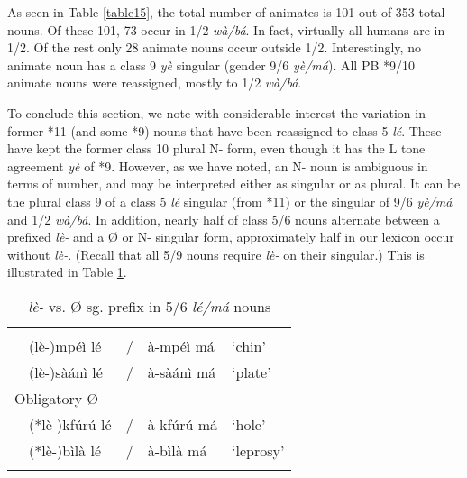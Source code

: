\documentclass[output=paper,,modfonts,nonflat]{langsci/langscibook-Hyman-et-al}
\begin{document}
As seen in Table \ref{table15}, the total number of animates is 101 out of 353 total nouns. Of these 101, 73 occur in 1/2 \textit{wà/bá}. In fact, virtually all humans are in 1/2. Of the rest only 28 animate nouns occur outside 1/2. Interestingly, no animate noun has a class 9 \textit{yè} singular (gender 9/6 \textit{yè/má}). All PB *9/10 animate nouns were reassigned, mostly to 1/2 \textit{wà/bá}.

To conclude this section, we note with considerable interest the variation in former *11 (and some *9) nouns that have been reassigned to class 5 \textit{lé}. These have kept the former class 10 plural N- form, even though it has the L tone agreement \textit{yè} of *9. However, as we have noted, an N- noun is ambiguous in terms of number, and may be interpreted either as singular or as plural. It can be the plural class 9 of a class 5 \textit{lé} singular (from *11) or the singular of 9/6 \textit{yè/má} and 1/2 \textit{wà/bá}. In addition, nearly half of class 5/6 nouns alternate between a prefixed \textit{lè-} and a Ø or N- singular form, approximately half in our lexicon occur without \textit{lè-}. (Recall that all 5/9 nouns require \textit{lè-} on their singular.) This is illustrated in Table \ref{table16}.


\begin{table}[!htbp]
\caption{\textit{lè-} vs. Ø sg. prefix in 5/6 \textit{lé/má} nouns}
\label{table16}
\begin{small}
\begin{tabular}[t]{l		l		l		l		l}
\lsptoprule	
\multicolumn{5}{l}{Optional Ø}							\\
	&	(lè-)mpéì lé	&	/	&	à-mpéì má	&	‘chin’	\\
	&	(lè-)sàánì lé	&	/	&	à-sàánì má	&	‘plate’	\\[0.2cm]
\multicolumn{5}{l}{Obligatory Ø}							\\
	&	(*lè-)kfúrú lé	&	/	&	à-kfúrú má	&	‘hole’	\\
	&	(*lè-)bìlà lé	&	/	&	à-bìlà má	&	‘leprosy’	\\
\lspbottomrule
\end{tabular}
\end{small}
\end{table}
\end{document}
